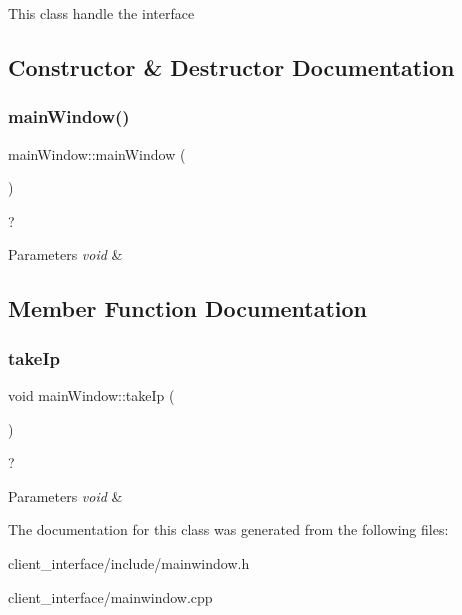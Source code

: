 This class handle the interface 

\subsection{Constructor \& Destructor Documentation}
\mbox{\label{classmain_window_a467ea0d8090c122e5b5fd69f77ed3476}} 
\subsubsection{\texorpdfstring{main\+Window()}{mainWindow()}}
{\footnotesize\ttfamily main\+Window\+::main\+Window (\begin{DoxyParamCaption}{ }\end{DoxyParamCaption})}



? 


\begin{DoxyParams}{Parameters}
{\em void} & \\
\hline
\end{DoxyParams}


\subsection{Member Function Documentation}
\mbox{\label{classmain_window_ae38f3474108e081d12b5c2bafd09714b}} 
\subsubsection{\texorpdfstring{take\+Ip}{takeIp}}
{\footnotesize\ttfamily void main\+Window\+::take\+Ip (\begin{DoxyParamCaption}{ }\end{DoxyParamCaption})\hspace{0.3cm}{\ttfamily [slot]}}



? 


\begin{DoxyParams}{Parameters}
{\em void} & \\
\hline
\end{DoxyParams}


The documentation for this class was generated from the following files\+:\begin{DoxyCompactItemize}
\item 
client\+\_\+interface/include/mainwindow.\+h\item 
client\+\_\+interface/mainwindow.\+cpp\end{DoxyCompactItemize}
